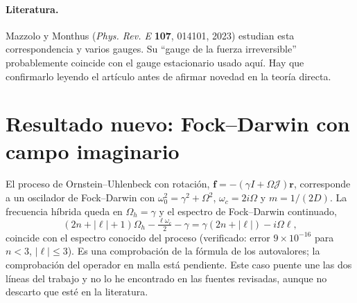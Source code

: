 \documentclass[11pt,a4paper]{article}
\newcommand{\rv}{\mathbf{r}}
\newcommand{\fv}{\mathbf{f}}
\begin{document}
\paragraph{Literatura.} Mazzolo y Monthus (\emph{Phys. Rev. E} \textbf{107}, 014101, 2023) estudian esta
correspondencia y varios gauges. Su ``gauge de la fuerza irreversible'' probablemente coincide con el gauge
estacionario usado aqu\'i. Hay que confirmarlo leyendo el art\'iculo antes de afirmar novedad en la teor\'ia
directa.

\section{Resultado nuevo: Fock--Darwin con campo imaginario}
El proceso de Ornstein--Uhlenbeck con rotaci\'on, $\fv=-(\gamma I+\Omega\mathcal J)\rv$, corresponde a un oscilador
de Fock--Darwin con $\omega_0^2=\gamma^2+\Omega^2$, $\omega_c=2i\Omega$ y $m=1/(2D)$. La frecuencia h\'ibrida queda
en $\Omega_h=\gamma$ y el espectro de Fock--Darwin continuado,
\[
  (2n+|\ell|+1)\Omega_h-\tfrac{\ell\omega_c}{2}-\gamma=\gamma(2n+|\ell|)-i\Omega\ell,
\]
coincide con el espectro conocido del proceso (verificado: error $9\times10^{-16}$ para $n<3$, $|\ell|\le3$). Es
una comprobaci\'on de la f\'ormula de los autovalores; la comprobaci\'on del operador en malla est\'a pendiente.
Este caso puente une las dos l\'ineas del trabajo y no lo he encontrado en las fuentes revisadas, aunque no
descarto que est\'e en la literatura.
\end{document}
